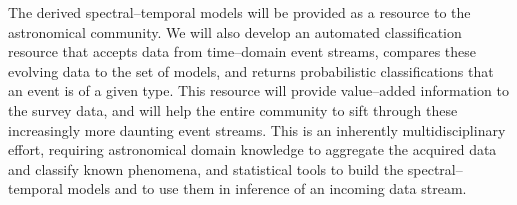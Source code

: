 \bigskip \centerline{}

The derived spectral--temporal models will be provided as a resource to the
astronomical community.  We will also develop an automated classification
resource that accepts data from time--domain event streams, compares these
evolving data to the set of models, and returns probabilistic classifications
that an event is of a given type.  This resource will provide value--added
information to the survey data, and will help the entire community to sift
through these increasingly more daunting event streams. This is an inherently
multidisciplinary effort, requiring astronomical domain knowledge to aggregate
the acquired data and classify known phenomena, and statistical tools to build
the spectral--temporal models and to use them in inference of an incoming data
stream.